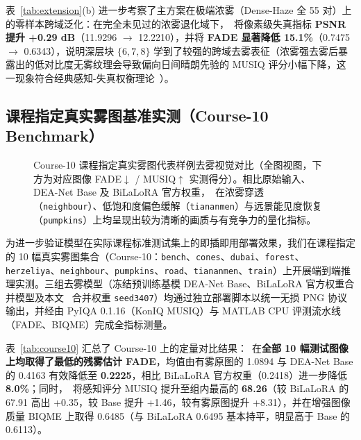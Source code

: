\documentclass[10pt,twocolumn,letterpaper]{article}
\begin{document}
表~\ref{tab:extension}(b) 进一步考察了主方案在极端浓雾（Dense-Haze 全 55 对）上的零样本跨域泛化：在完全未见过的浓雾退化域下，\method~将像素级失真指标 \textbf{PSNR 提升 +0.29 dB}（11.9296 $\to$ 12.2210），并将 \textbf{FADE 显著降低 15.1\%}（0.7475 $\to$ 0.6343），说明深层块 $\{6,7,8\}$ 学到了较强的跨域去雾表征（浓雾强去雾后暴露出的低对比度无雾纹理会导致偏向日间晴朗先验的 MUSIQ 评分小幅下降，这一现象符合经典感知-失真权衡理论~\cite{perception2018}）。

\subsection{课程指定真实雾图基准实测（Course-10 Benchmark）}
\begin{table}[t]
\centering\small\setlength{\tabcolsep}{3pt}

\caption{Course-10 课程指定真实雾图基准（$n=10$）统一无损协议实测结果。所有模型均通过部署脚本 \texttt{dehaze.py} 输出无损 uint8 PNG 后统一评测。与分别表示最优与次优。}
\label{tab:course10}
\end{table}

\begin{figure}[t]
\centering
\caption{Course-10 课程指定真实雾图代表样例去雾视觉对比（全图视图，下方为对应图像 FADE$\downarrow$ / MUSIQ$\uparrow$ 实测得分）。相比原始输入、DEA-Net Base 及 BiLaLoRA 官方权重，\method~在浓雾穿透（\texttt{neighbour}）、低饱和度偏色缓解（\texttt{tiananmen}）与远景能见度恢复（\texttt{pumpkins}）上均呈现出较为清晰的画质与有竞争力的量化指标。}
\label{fig:course10}
\end{figure}

为进一步验证模型在实际课程标准测试集上的即插即用部署效果，我们在课程指定的 10 幅真实雾图集合（Course-10：\texttt{bench}、\texttt{cones}、\texttt{dubai}、\texttt{forest}、\texttt{herzeliya}、\texttt{neighbour}、\texttt{pumpkins}、\texttt{road}、\texttt{tiananmen}、\texttt{train}）上开展端到端推理实测。三组去雾模型（冻结预训练基模 DEA-Net Base、BiLaLoRA 官方权重合并模型及本文 \method~合并权重 \texttt{seed3407}）均通过独立部署脚本以统一无损 PNG 协议输出，并经由 PyIQA 0.1.16（KonIQ MUSIQ）与 MATLAB CPU 评测流水线（FADE、BIQME）完成全指标测量。

表~\ref{tab:course10} 汇总了 Course-10 上的定量对比结果：\method~在\textbf{全部 10 幅测试图像上均取得了最低的残雾估计 FADE}，均值由有雾原图的 1.0894 与 DEA-Net Base 的 0.4163 有效降低至 \textbf{0.2225}，相比 BiLaLoRA 官方权重（0.2418）进一步降低 \textbf{8.0\%}；同时，\method~将感知评分 MUSIQ 提升至组内最高的 \textbf{68.26}（较 BiLaLoRA 的 67.91 高出 +0.35，较 Base 提升 +1.46，较有雾原图提升 +8.31），并在增强图像质量 BIQME 上取得 0.6485（与 BiLaLoRA 0.6495 基本持平，明显高于 Base 的 0.6113）。
\end{document}
